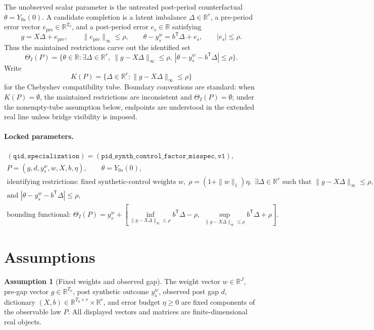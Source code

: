 \documentclass[11pt]{article}
\newcommand{\transpose}{\mathsf{T}}
\newcommand{\R}{\mathbb{R}}
\theoremstyle{definition}
\newtheorem{assumption}{Assumption}
\theoremstyle{plain}
\theoremstyle{remark}
\begin{document}
The unobserved scalar parameter is the untreated post-period counterfactual
\(\theta=Y_{0s}(0)\).  A candidate completion is a latent imbalance
\(\Delta\in\R^r\), a pre-period error vector \(e_{\mathrm{pre}}\in\R^{T_0}\),
and a post-period error \(e_s\in\R\) satisfying
\[
g=X\Delta+e_{\mathrm{pre}},\qquad
\|e_{\mathrm{pre}}\|_\infty\le\rho,\qquad
\theta-y_s^w=b^\transpose\Delta+e_s,\qquad
|e_s|\le\rho.
\]
Thus the maintained restrictions carve out the identified set
\[
\Theta_I(P)=
\{\theta\in\R:\exists \Delta\in\R^r,\ \|g-X\Delta\|_\infty\le\rho,\ 
|\theta-y_s^w-b^\transpose\Delta|\le\rho\}.
\]
Write
\[
K(P)=\{\Delta\in\R^r:\|g-X\Delta\|_\infty\le\rho\}
\]
for the Chebyshev compatibility tube.  Boundary conventions are standard:
when \(K(P)=\emptyset\), the maintained restrictions are inconsistent and
\(\Theta_I(P)=\emptyset\); under the nonempty-tube assumption below, endpoints
are understood in the extended real line unless bridge visibility is imposed.

\paragraph{Locked parameters.}
\[
\begin{gathered}
(\texttt{qid},\texttt{specialization})
  =(\texttt{pid\_synth\_control\_factor\_misspec},\texttt{v1}),\\
P=(g,d,y_s^w,w,X,b,\eta),\qquad
\theta=Y_{0s}(0),\\
\text{identifying restrictions: fixed synthetic-control weights }w,\;
\rho=(1+\|w\|_1)\eta,\;\exists \Delta\in\R^r
\text{ such that }\|g-X\Delta\|_\infty\le \rho,\\
\text{and } |\theta-y_s^w-b^\transpose \Delta|\le \rho,\\
\text{bounding functional: }
\Theta_I(P)=y_s^w+
\left[
\inf_{\|g-X\Delta\|_\infty\le\rho}b^\transpose\Delta-\rho,\;
\sup_{\|g-X\Delta\|_\infty\le\rho}b^\transpose\Delta+\rho
\right].
\end{gathered}
\]

\section{Assumptions}
\begin{assumption}[Fixed weights and observed gap]\label{ass:fixed-weights}
The weight vector \(w\in\R^J\), pre-gap vector \(g\in\R^{T_0}\), post synthetic
outcome \(y_s^w\), observed post gap \(d\), dictionary
\((X,b)\in\R^{T_0\times r}\times\R^r\), and error budget \(\eta\ge0\) are fixed
components of the observable law \(P\).  All displayed vectors and matrices are
finite-dimensional real objects.
\end{assumption}
\end{document}
